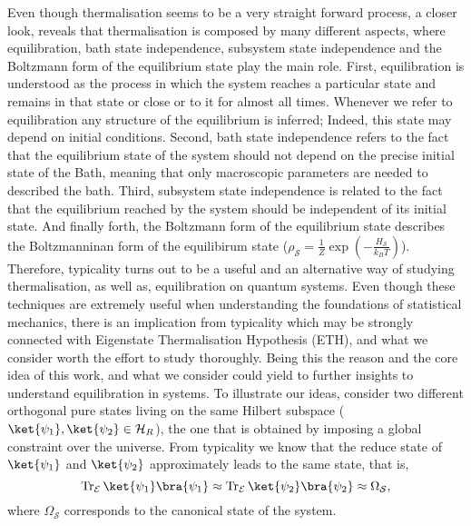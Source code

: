 \indent Even though thermalisation seems to be a very straight forward process, a closer look, reveals that thermalisation is composed by many different aspects, where equilibration, bath state independence, subsystem state independence and the Boltzmann form of the equilibrium state play the main role\cite{linden_quantum_2009}. First, equilibration is understood as the process in which the system reaches a particular state and remains in that state or close or to it for almost all times. Whenever we refer to equilibration any structure of the equilibrium is inferred; Indeed, this state may depend on initial conditions. Second, bath state independence refers to the fact that the equilibrium state of the system should not depend on the precise initial state of the Bath, meaning that only macroscopic parameters are needed to described the bath. Third, subsystem state independence is related to the fact that the equilibrium reached by the system should be independent of its initial state. And finally forth, the Boltzmann form of the equilibrium state describes the Boltzmanninan form of the equilibirum state ($\rho_{\mathcal{S}}=\frac{1}{Z}\operatorname{exp}(-\frac{H_{\mathcal{S}}}{k_B T})$). Therefore, typicality turns out to be a useful and an alternative way of studying thermalisation, as well as, equilibration on quantum systems. Even though these techniques are extremely useful when understanding the foundations of statistical mechanics, there is an implication from typicality which may be strongly connected with Eigenstate Thermalisation Hypothesis (ETH)\cite{srednicki_chaos_1994,deutsch_quantum_1991,rigol_alternatives_2012}, and what we consider worth the effort to study thoroughly. Being this the reason and the core idea of this work, and what we consider could yield to further insights to understand equilibration in systems. To illustrate our ideas, consider two different orthogonal pure states living on the same Hilbert subspace ($\ket{\psi_1},\ket{\psi_2} \in \mathcal{H}_{R}$), the one that is obtained by imposing a global constraint over the universe. From typicality we know that the reduce state of $\ket{\psi_1}$ and $\ket{\psi_2}$ approximately leads to the same state, that is, 
\begin{equation}
\operatorname{Tr}_{\mathcal{E}}\ket{\psi_1}\bra{\psi_1}\approx\operatorname{Tr}_{\mathcal{E}}\ket{\psi_2}\bra{\psi_2}\approx\Omega_{\mathcal{S}},
\end{equation}
where $\Omega_{\mathcal{S}}$ corresponds to the canonical state of the system.
